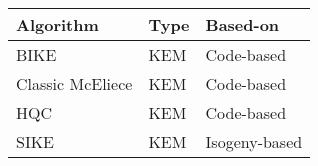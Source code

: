 \begin{tabular}{|l|l|l|}
  \hline
  Algorithm        & Type & Based-on      \\
  \hline
  BIKE             & KEM  & Code-based    \\
  Classic McEliece & KEM  & Code-based    \\
  HQC              & KEM  & Code-based    \\
  SIKE             & KEM  & Isogeny-based \\
  \hline
\end{tabular}